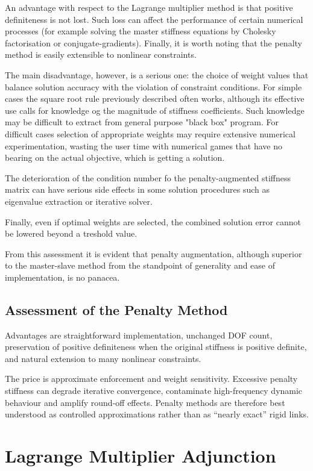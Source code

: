An advantage with respect to the Lagrange multiplier method is that positive
definiteness is not lost. Such loss can affect the performance of certain numerical
processes (for example solving the master stiffness equations by Cholesky
factorisation or conjugate-gradients). Finally, it is worth noting that the
penalty method is easily extensible to nonlinear constraints.

The main disadvantage, however, is a serious one: the choice of weight values
that balance solution accuracy with the violation of constraint conditions.
For simple cases the square root rule previously described often works, although
its effective use calls for knowledge og the magnitude of stiffness coefficients.
Such knowledge may be difficult to extract from general purpose "black box" program.
For difficult cases selection of appropriate weights may require extensive
numerical experimentation, wasting the user time with numerical games that have
no bearing on the actual objective, which is getting a solution.

The deterioration of the condition number fo the penalty-augmented stiffness
matrix can have serious side effects in some solution procedures such as
eigenvalue extraction or iterative solver.

Finally, even if optimal weights are selected, the combined solution error cannot
be lowered beyond a treshold value.

From this assessment it is evident that penalty augmentation, although superior
to the master-slave method from the standpoint of generality and ease of
implementation, is no panacea.



\subsection{Assessment of the Penalty Method}

Advantages are straightforward implementation, unchanged DOF count, preservation
of positive definiteness when the original stiffness is positive definite, and
natural extension to many nonlinear constraints.

The price is approximate enforcement and weight sensitivity. Excessive penalty
stiffness can degrade iterative convergence, contaminate high-frequency dynamic
behaviour and amplify round-off effects. Penalty methods are therefore best
understood as controlled approximations rather than as ``nearly exact'' rigid
links.

\section{Lagrange Multiplier Adjunction}\label{sec:mfc-lagrange}

